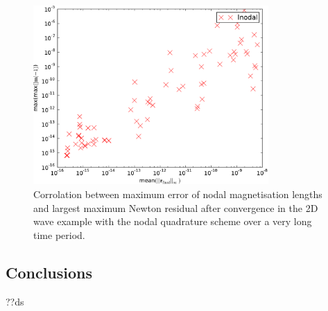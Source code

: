 \begin{figure}
  \centering
  \includegraphics[width=0.8\textwidth]
  {plots/2d_wave_solution_m_length_newton_res/-maxmaxmathbfm-1vsmeanmathbfr_mathrmfinal_infty.pdf}
  \caption{Corrolation between maximum error of nodal magnetisation lengths and largest maximum Newton residual after convergence in the 2D wave example with the nodal quadrature scheme over a very long time period.}
  \label{fig:mean-ml-error-2d-nodal-newton-tests}
\end{figure}









\subsection{Conclusions}

??ds


